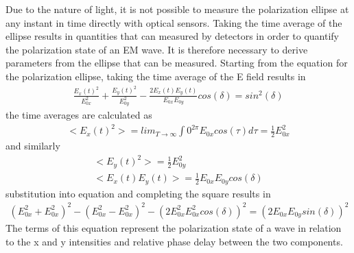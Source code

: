 Due to the nature of light, it is not possible to measure the polarization ellipse at any instant in time directly with optical sensors.  Taking the time average of the ellipse results in quantities that can measured by detectors in order to quantify the polarization state of an EM wave.  It is therefore necessary to derive parameters from the ellipse that can be measured.
Starting from the equation for the polarization ellipse, taking the time average of the E field results in
%
\begin{align}
    \frac{E_x (t)^2}{E_{0x}^2} + \frac{E_y (t)^2}{E_{0y}^2} - \frac{2 E_x (t) E_y (t)}{E_{0x} E_{0y} } cos(\delta)=sin^2 (\delta)
\end{align}
%
the time averages are calculated as
%
\begin{align}
<E_x (t)^2> =   lim_{T\to\infty}\int{0}^{2\pi} E_{0x} cos(\tau)  d\tau=\frac{1}{2} E_{0x}^2
\end{align}
%
and similarly
%
\begin{align}
    <E_y (t)^2>  = \frac{1}{2} E_{0y}^2 \\
	<E_x (t) E_y (t)>  =  \frac{1}{2} E_{0x} E_{0y} cos(\delta)
\end{align}
%
substitution into equation and completing the square results in
%
\begin{align}
    (E_{0x}^2+E_{0x}^2 )^2-(E_{0x}^2-E_{0x}^2 )^2-(2E_{0x}^2 E_{0x}^2  cos(\delta) )^2=(2E_{0x} E_{0y}  sin(\delta))^2
\end{align}
%
The terms of this equation represent the polarization state of a wave in relation to the x and y intensities and relative phase delay between the two components.

